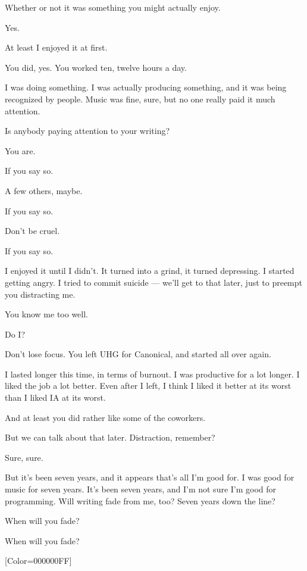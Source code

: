 \begin{paracol}{2}
\begin{leftcolumn}
\begin{ally}
Whether or not it was something you might actually enjoy.
\end{ally}
Yes.
\newpage

\noindent At least I enjoyed it at first.

\begin{ally}
You did, yes. You worked ten, twelve hours a day.
\end{ally}
I was doing something. I was actually producing something, and it was being recognized by people. Music was fine, sure, but no one really paid it much attention.

\begin{ally}
Is anybody paying attention to your writing?
\end{ally}
You are.

\begin{ally}
If you say so.
\end{ally}
A few others, maybe.

\begin{ally}
If you say so.
\end{ally}
Don't be cruel.

\begin{ally}
If you say so.
\end{ally}
\newpage

\noindent I enjoyed it until I didn't. It turned into a grind, it turned depressing. I started getting angry. I tried to commit suicide --- we'll get to that later, just to preempt you distracting me.

\begin{ally}
You know me too well.
\end{ally}
Do I?

\begin{ally}
Don't lose focus. You left UHG for Canonical, and started all over again.
\end{ally}
I lasted longer this time, in terms of burnout. I was productive for a lot longer. I liked the job a lot better. Even after I left, I think I liked it better at its worst than I liked IA at its worst.

\begin{ally}
And at least you did rather like some of the coworkers.
\end{ally}
But we can talk about that later. Distraction, remember?

\begin{ally}
Sure, sure.
\end{ally}
But it's been seven years, and it appears that's all I'm good for. I was good for music for seven years. It's been seven years, and I'm not sure I'm good for programming. Will writing fade from me, too? Seven years down the line?

When will you fade?

\begin{ally}
When will you fade?
\end{ally}
\newpage
\end{leftcolumn}
\end{paracol}
\resetbackgroundcolor

\renewfontfamily{}[Color=000000FF]

